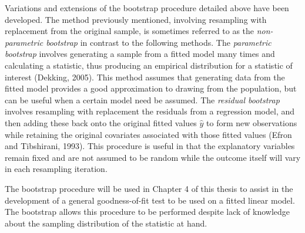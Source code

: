 		Variations and extensions of the bootstrap procedure detailed above have been developed. The method previously mentioned, involving resampling with replacement from the original sample, is sometimes
		referred to as the \textit{non-parametric bootstrap} in contrast to the following methods. The \textit{parametric bootstrap} involves generating a sample from a fitted model many times and calculating
		a statistic, thus producing an empirical distribution for a statistic of interest (Dekking, 2005). This method assumes that generating data from the fitted model provides a good approximation to drawing from the
		population, but can be useful when a certain model need be assumed. The \textit{residual bootstrap} involves resampling with replacement the residuals from a regression model, and then adding
		these back onto the original fitted values $\hat{y}$ to form new observations while retaining the original covariates associated with those fitted values (Efron and Tibshirani, 1993). This procedure
		is useful in that the explanatory variables remain fixed and are not assumed to be random while the outcome itself will vary in each resampling iteration.

		The bootstrap procedure will be used in Chapter 4 of this thesis to assist in the development of a general goodness-of-fit test to be used on a fitted linear model. The bootstrap allows this procedure
		to be performed despite lack of knowledge about the sampling distribution of the statistic at hand.



		
